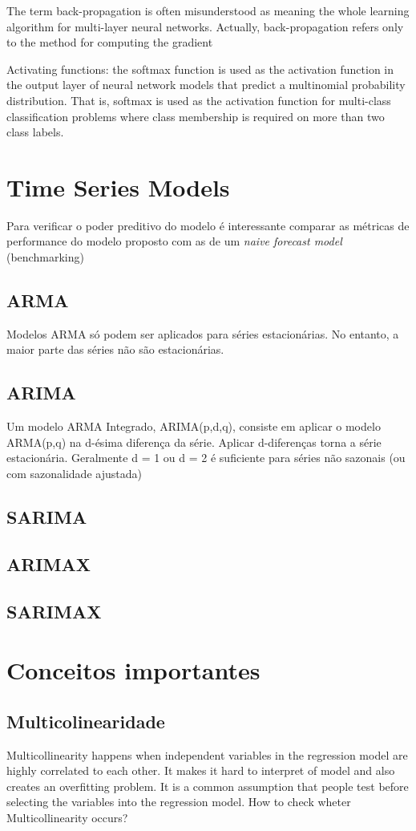 The term back-propagation is often misunderstood as meaning the whole
learning algorithm for multi-layer neural networks. Actually, back-propagation refers only to the method for computing the gradient

Activating functions: the softmax function is used as the activation function in the output layer of neural network models that predict a multinomial probability distribution. That is, softmax is used as the activation function for multi-class classification problems where class membership is required on more than two class labels.

\section{Time Series Models}
Para verificar o poder preditivo do modelo é interessante comparar as métricas de performance do modelo proposto com as de um \textit{naive forecast model} (benchmarking)

\subsection{ARMA}
Modelos ARMA só podem ser aplicados para séries estacionárias. No
entanto, a maior parte das séries não são estacionárias.
\subsection{ARIMA}
Um modelo ARMA Integrado, ARIMA(p,d,q), consiste em aplicar o
modelo ARMA(p,q) na d-ésima diferença da série. Aplicar d-diferenças torna a série estacionária. Geralmente d = 1 ou d = 2 é suficiente para séries não sazonais (ou com sazonalidade ajustada)
\subsection{SARIMA}
\subsection{ARIMAX}
\subsection{SARIMAX}

\section{Conceitos importantes}

\subsection{Multicolinearidade}
Multicollinearity happens when independent variables in the regression model are highly correlated to each other. It makes it hard to interpret of model and also creates an overfitting problem. It is a common assumption that people test before selecting the variables into the regression model. How to check wheter Multicollinearity occurs?

